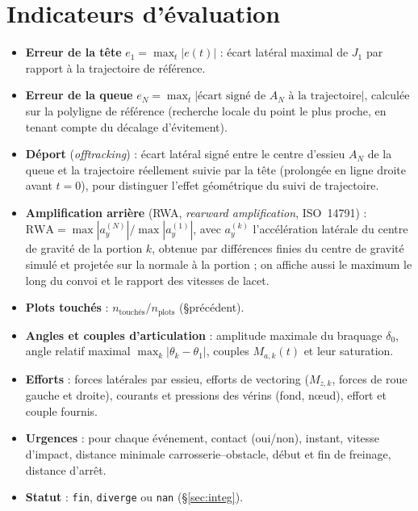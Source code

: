 \documentclass[11pt,a4paper]{article}
\newcommand{\code}[1]{\texttt{#1}}
\begin{document}
\section{Indicateurs d'évaluation}\label{sec:indic}
\begin{itemize}
 \item \textbf{Erreur de la tête} $e_1=\max_t|e(t)|$ : écart latéral maximal de $J_1$ par rapport à la trajectoire de référence.
 \item \textbf{Erreur de la queue} $e_N=\max_t\big|\text{écart signé de }A_N\text{ à la trajectoire}\big|$, calculée sur la polyligne de référence (recherche locale du point le plus proche, en tenant compte du décalage d'évitement).
 \item \textbf{Déport} (\emph{offtracking}) : écart latéral signé entre le centre d'essieu $A_N$ de la queue et la trajectoire réellement suivie par la tête (prolongée en ligne droite avant $t=0$), pour distinguer l'effet géométrique du suivi de trajectoire.
 \item \textbf{Amplification arrière} (RWA, \emph{rearward amplification}, ISO~14791) : $\mathrm{RWA}=\max|a_y^{(N)}|/\max|a_y^{(1)}|$, avec $a_y^{(k)}$ l'accélération latérale du centre de gravité de la portion $k$, obtenue par différences finies du centre de gravité simulé et projetée sur la normale à la portion ; on affiche aussi le maximum le long du convoi et le rapport des vitesses de lacet.
 \item \textbf{Plots touchés} : $n_{\text{touchés}}/n_{\text{plots}}$ (§précédent).
 \item \textbf{Angles et couples d'articulation} : amplitude maximale du braquage $\delta_0$, angle relatif maximal $\max_k|\theta_k-\theta_1|$, couples $M_{a,k}(t)$ et leur saturation.
 \item \textbf{Efforts} : forces latérales par essieu, efforts de vectoring ($M_{z,k}$, forces de roue gauche et droite), courants et pressions des vérins (fond, nœud), effort et couple fournis.
 \item \textbf{Urgences} : pour chaque événement, contact (oui/non), instant, vitesse d'impact, distance minimale carrosserie--obstacle, début et fin de freinage, distance d'arrêt.
 \item \textbf{Statut} : \code{fin}, \code{diverge} ou \code{nan} (§\ref{sec:integ}).
\end{itemize}

\end{document}
